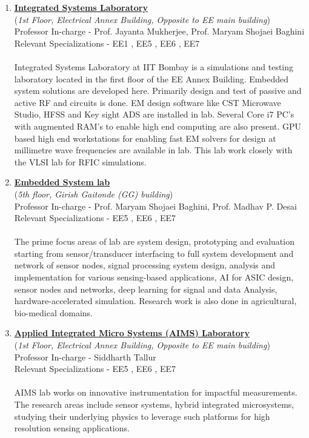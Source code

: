 \documentclass[openany]{book} %
\begin{document}
\begin{enumerate}
\item \href{https://www.ee.iitb.ac.in/web/research/labs/isl} {\color{blue} \textbf{Integrated Systems Laboratory}}\\
    (\textit{1st Floor, Electrical Annex Building, Opposite to EE main building})\\
    Professor In-charge - Prof. Jayanta Mukherjee, Prof. Maryam Shojaei Baghini\\
Relevant Specializations - EE1 , EE5 , EE6 , EE7\\
\\
Integrated Systems Laboratory at IIT Bombay is a simulations and testing laboratory located in the first floor of the EE Annex Building. Embedded system solutions are developed here. Primarily design and test of passive and active RF and circuits is done. EM design software like CST Microwave Studio, HFSS and Key sight ADS are installed in lab. Several Core i7 PC's with augmented RAM's to enable high end computing are also present. GPU based high end workstations for enabling fast EM solvers for design at millimetre wave frequencies are available in lab. This lab work closely with the VLSI lab for RFIC simulations.\\


\item \href{https://www.ee.iitb.ac.in/web/research/labs/emsys} {\color{blue} \textbf{Embedded System lab}}\\
    (\textit{5th floor, Girish Gaitonde (GG) building})\\
    Professor In-charge - Prof. Maryam Shojaei Baghini, Prof. Madhav P. Desai\\
Relevant Specializations - EE5 , EE6 , EE7\\
\\
The prime focus areas of lab are system design, prototyping and evaluation starting from sensor/transducer interfacing to full system development and network of sensor nodes, signal processing system design, analysis and implementation for various sensing-based applications, AI for ASIC design, sensor nodes and networks, deep learning for signal and data Analysis, hardware-accelerated simulation. Research work is also done in agricultural, bio-medical domains.\\

\item \href{http://www.ee.iitb.ac.in/~stallur/index.php/} {\color{blue} \textbf{Applied Integrated Micro Systems (AIMS) Laboratory}}\\
    (\textit{1st Floor, Electrical Annex Building, Opposite to EE main building})\\
    Professor In-charge - Siddharth Tallur\\
Relevant Specializations - EE5 , EE6 , EE7\\
\\
AIMS lab works on  innovative instrumentation for impactful measurements. The research areas include sensor systems, hybrid integrated microsystems,  studying their underlying physics  to leverage such platforms for high resolution sensing applications.\\


\end{enumerate}
\end{document}
